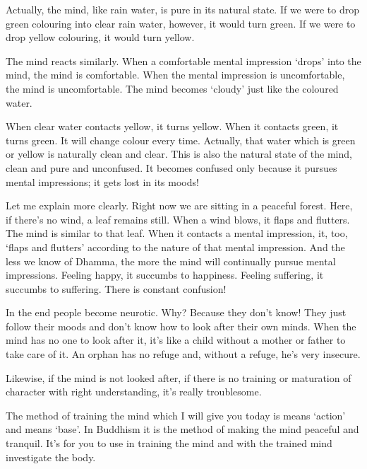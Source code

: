  Actually, the mind, like rain water, is pure in its natural state. If we were to drop green colouring into clear rain water, however, it would turn green. If we were to drop yellow colouring, it would turn yellow. 

 The mind reacts similarly. When a comfortable mental impression `drops' into the mind, the mind is comfortable. When the mental impression is uncomfortable, the mind is uncomfortable. The mind becomes `cloudy' just like the coloured water. 

 When clear water contacts yellow, it turns yellow. When it contacts green, it turns green. It will change colour every time. Actually, that water which is green or yellow is naturally clean and clear. This is also the natural state of the mind, clean and pure and unconfused. It becomes confused only because it pursues mental impressions; it gets lost in its moods! 

 Let me explain more clearly. Right now we are sitting in a peaceful forest. Here, if there's no wind, a leaf remains still. When a wind blows, it flaps and flutters. The mind is similar to that leaf. When it contacts a mental impression, it, too, `flaps and flutters' according to the nature of that mental impression. And the less we know of Dhamma, the more the mind will continually pursue mental impressions. Feeling happy, it succumbs to happiness. Feeling suffering, it succumbs to suffering. There is constant confusion! 

 In the end people become neurotic. Why? Because they don't know! They just follow their moods and don't know how to look after their own minds. When the mind has no one to look after it, it's like a child without a mother or father to take care of it. An orphan has no refuge and, without a refuge, he's very insecure. 

 Likewise, if the mind is not looked after, if there is no training or maturation of character with right understanding, it's really troublesome. 

 The method of training the mind which I will give you today is   means `action' and  means `base'. In Buddhism it is the method of making the mind peaceful and tranquil. It's for you to use in training the mind and with the trained mind investigate the body. 

